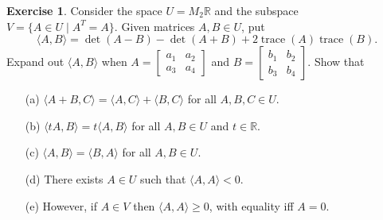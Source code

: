 \documentclass{amsart}
\newcommand{\R}         {{\mathbb{R}}}
\newcommand{\trc}       {\operatorname{trace}}
\newcommand{\bsm}       {\left[\begin{smallmatrix}}
\newcommand{\esm}       {\end{smallmatrix}\right]}
\newcommand{\st}        {\;|\;}
\newcommand{\ip}[1]     {\langle #1\rangle}
\renewcommand{\:}       {\colon}
\theoremstyle{definition}
\newtheorem{exercise}{Exercise}[section]
\begin{document}
\begin{exercise}
 Consider the space $U=M_2\R$ and the subspace
 $V=\{A\in U\st A^T=A\}$.  Given matrices $A,B\in U$, put
 \[ \ip{A,B} = \det(A-B) - \det(A+B) + 2\trc(A)\trc(B). \]
 Expand out $\ip{A,B}$ when $A=\bsm a_1&a_2\\ a_3&a_4\esm$
 and $B=\bsm b_1&b_2\\ b_3&b_4\esm$.  Show that 
 \begin{itemize}
  \item[(a)] $\ip{A+B,C}=\ip{A,C}+\ip{B,C}$ for all
   $A,B,C\in U$.
  \item[(b)] $\ip{tA,B}=t\ip{A,B}$ for all $A,B\in U$ and
   $t\in\R$.
  \item[(c)] $\ip{A,B}=\ip{B,A}$ for all $A,B\in U$.
  \item[(d)] There exists $A\in U$ such that $\ip{A,A}<0$. 
  \item[(e)] However, if $A\in V$ then $\ip{A,A}\geq 0$,
   with equality iff $A=0$.  
 \end{itemize}
\end{exercise}
\end{document}
